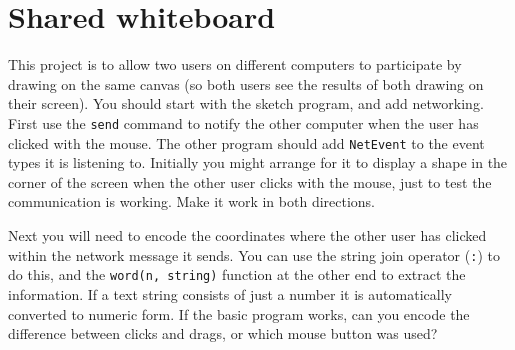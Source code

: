\documentclass[12pt,a4paper,twoside]{article}
\renewcommand{\_}{\texttt{\symbol{95}}}
\begin{document}
%
%
%

\newpage
\section{Shared whiteboard}

This project is to allow two users on different computers to participate
by drawing on the same canvas (so both users see the results of both
drawing on their screen). You should start with the sketch program,
and add networking. First use the \verb^send^ command to notify the other
computer when the user has clicked with the mouse. The other program
should add \verb^NetEvent^ to the event types it is listening to.
Initially you might arrange for it to display a shape in the
corner of the screen when the other user clicks with the mouse, just to
test the communication is working. Make it work in both directions.

Next you will need to encode the coordinates where the other user has
clicked within the network message it sends. You can use the string
join operator (\verb^:^) to do this, and the \verb^word(n, string)^
function at the other end to extract the information. If a text string
consists of just a number it is automatically converted to numeric form.
If the basic program works, can you encode the difference between
clicks and drags, or which mouse button was used?
\end{document}
